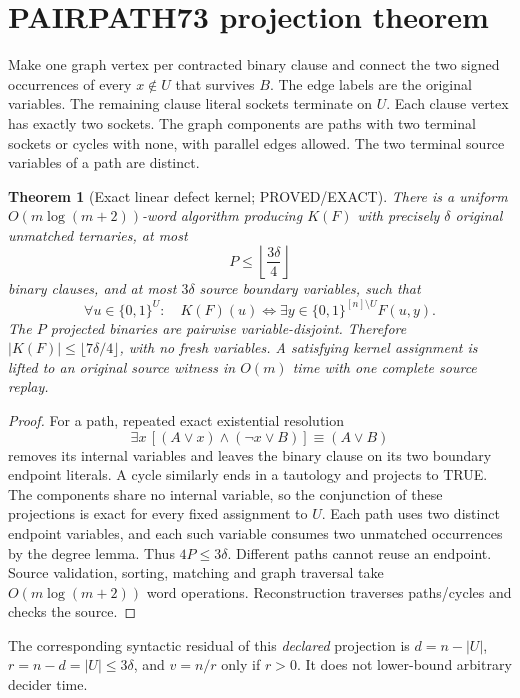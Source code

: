 \documentclass[11pt]{article}
\newtheorem{theorem}{Theorem}
\begin{document}
\section{PAIRPATH73 projection theorem}
Make one graph vertex per contracted binary clause and connect the two signed occurrences of every $x\notin U$ that survives $B$. The edge labels are the original variables. The remaining clause literal sockets terminate on $U$. Each clause vertex has exactly two sockets. The graph components are paths with two terminal sockets or cycles with none, with parallel edges allowed. The two terminal source variables of a path are distinct.

\begin{theorem}[Exact linear defect kernel; PROVED/EXACT]
There is a uniform $O(m\log(m+2))$-word algorithm producing $K(F)$ with precisely $\delta$ original unmatched ternaries, at most
\[
P\le \left\lfloor\frac{3\delta}{4}\right\rfloor
\]
binary clauses, and at most $3\delta$ source boundary variables, such that
\[
\forall u\in\{0,1\}^{U}:\quad K(F)(u)\iff \exists y\in\{0,1\}^{[n]\setminus U} F(u,y).
\]
The $P$ projected binaries are pairwise variable-disjoint. Therefore $|K(F)|\le\lfloor 7\delta/4\rfloor$, with no fresh variables. A satisfying kernel assignment is lifted to an original source witness in $O(m)$ time with one complete source replay.
\end{theorem}
\begin{proof}
For a path, repeated exact existential resolution
\[
\exists x\,[(A\vee x)\wedge(\neg x\vee B)]\equiv(A\vee B)
\]
removes its internal variables and leaves the binary clause on its two boundary endpoint literals. A cycle similarly ends in a tautology and projects to TRUE. The components share no internal variable, so the conjunction of these projections is exact for every fixed assignment to $U$. Each path uses two distinct endpoint variables, and each such variable consumes two unmatched occurrences by the degree lemma. Thus $4P\le 3\delta$. Different paths cannot reuse an endpoint. Source validation, sorting, matching and graph traversal take $O(m\log(m+2))$ word operations. Reconstruction traverses paths/cycles and checks the source.
\end{proof}
The corresponding syntactic residual of this \emph{declared} projection is $d=n-|U|$, $r=n-d=|U|\le3\delta$, and $v=n/r$ only if $r>0$. It does not lower-bound arbitrary decider time.
\end{document}
